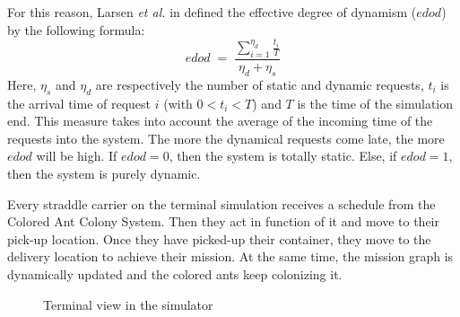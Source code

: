 \documentclass[journal]{IEEEtran}
\let\MYoriglatexcaption\caption
\renewcommand{\caption}[2][\relax]{\MYoriglatexcaption[#2]{#2}}
\begin{document}
For this reason, Larsen \textit{et al.} in \cite{larsen00} defined the effective degree
of dynamism ($edod$) by the following formula: \\
\begin{equation}
	edod\;=\; \frac{\sum_{i=1}^{\eta_d}\frac{t_i}{T}}{\eta_d+\eta_s}
\end{equation}
Here, $\eta_s$ and $\eta_d$ are respectively the number of static and dynamic
requests, $t_i$ is the arrival time of request $i$ (with $0 < t_i < T $) and $T$ is the time of
the simulation end. This measure takes into account the average of the incoming
time of the requests into the system. The more the dynamical requests come late,
the more $edod$ will be high. If $edod=0$, then the system is totally static.
Else, if $edod = 1$, then the system is purely dynamic.


Every straddle carrier on the terminal simulation receives a schedule from the
Colored Ant Colony System. Then they act in function of it and move to their
pick-up location. Once they have picked-up their container, they move to the
delivery location to achieve their mission. At the same time, the mission graph
is dynamically updated and the colored ants keep colonizing it.\\

\begin{figure}
\caption{Terminal view in the simulator}
\label{tview}
\end{figure}
\end{document}
